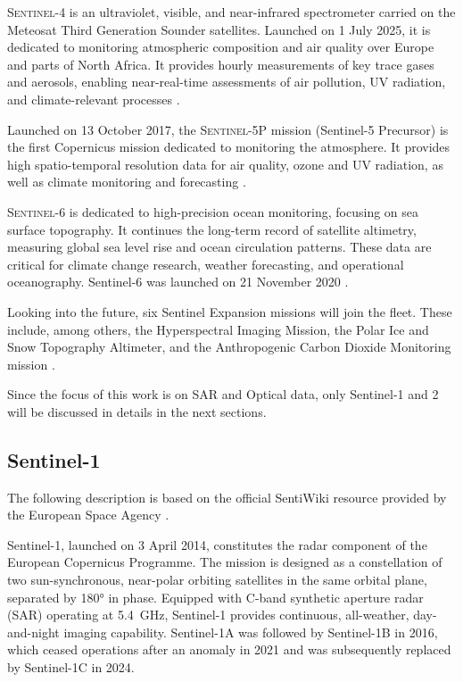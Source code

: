 \textsc{Sentinel-4} is an ultraviolet, visible, and near-infrared spectrometer carried on the Meteosat Third Generation Sounder satellites. Launched on 1 July 2025, it is dedicated to monitoring atmospheric composition and air quality over Europe and parts of North Africa. It provides hourly measurements of key trace gases and aerosols, enabling near-real-time assessments of air pollution, UV radiation, and climate-relevant processes \cite{ESA_Copernicus}.

Launched on 13 October 2017, the \textsc{Sentinel-5P} mission (Sentinel-5 Precursor) is the first Copernicus mission dedicated to monitoring the atmosphere. It provides high spatio-temporal resolution data for air quality, ozone and UV radiation, as well as climate monitoring and forecasting \cite{ESA_SentinelMissions}.

\textsc{Sentinel-6} is dedicated to high-precision ocean monitoring, focusing on sea surface topography. It continues the long-term record of satellite altimetry, measuring global sea level rise and ocean circulation patterns. These data are critical for climate change research, weather forecasting, and operational oceanography. Sentinel-6 was launched on 21 November 2020 \cite{ESA_SentinelMissions}. 

Looking into the future, six Sentinel Expansion missions will join the fleet. These include, among others, the Hyperspectral Imaging Mission, the Polar Ice and Snow Topography Altimeter, and the Anthropogenic Carbon Dioxide Monitoring mission \cite{ESA_Copernicus}.

Since the focus of this work is on SAR and Optical data, only Sentinel-1 and 2 will be discussed in details in the next sections. 
\subsection{Sentinel-1}
The following description is based on the official SentiWiki resource provided by the European Space Agency \cite{sentiwiki}. 

Sentinel-1, launched on 3 April 2014, constitutes the radar component of the European Copernicus Programme. The mission is designed as a constellation of two sun-synchronous, near-polar orbiting satellites in the same orbital plane, separated by 180° in phase. Equipped with C-band synthetic aperture radar (SAR) operating at 5.4~GHz, Sentinel-1 provides continuous, all-weather, day-and-night imaging capability. Sentinel-1A was followed by Sentinel-1B in 2016, which ceased operations after an anomaly in 2021 and was subsequently replaced by Sentinel-1C in 2024.  


